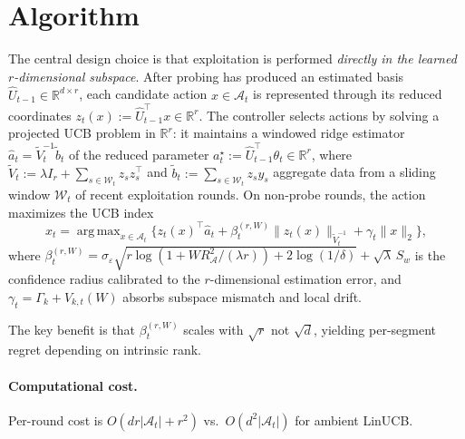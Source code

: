 \documentclass[11pt]{article}
\newcommand{\R}{\mathbb{R}}
\newcommand{\cA}{\mathcal{A}}
\DeclareMathOperator*{\argmax}{arg\,max}
\begin{document}
\section{Algorithm}
\label{sec:algorithm}

The central design choice is that exploitation is performed \emph{directly in the
learned $r$-dimensional subspace}.
After probing has produced an estimated basis
$\widehat{U}_{t-1}\in\R^{d\times r}$, each candidate action $x\in\cA_t$ is
represented through its reduced coordinates
$z_t(x):=\widehat{U}_{t-1}^\top x\in\R^r$.
The controller selects actions by solving a projected UCB problem in $\R^r$:
it maintains a windowed ridge estimator
$\widehat{a}_t = \widetilde{V}_t^{-1}\widetilde{b}_t$ of the reduced parameter
$a_t^\star := \widehat{U}_{t-1}^\top\theta_t\in\R^r$, where
$\widetilde{V}_t := \lambda I_r + \sum_{s\in\mathcal{W}_t}z_sz_s^\top$ and
$\widetilde{b}_t := \sum_{s\in\mathcal{W}_t}z_sy_s$ aggregate data from a sliding
window $\mathcal{W}_t$ of recent exploitation rounds.
On non-probe rounds, the action maximizes the UCB index
\[
x_t = \argmax_{x\in\cA_t}\bigl\{
  z_t(x)^\top\widehat{a}_t
  + \beta_t^{(r,W)}\|z_t(x)\|_{\widetilde{V}_t^{-1}}
  + \gamma_t\|x\|_2
\bigr\},
\]
where $\beta_t^{(r,W)}=\sigma_\varepsilon\sqrt{r\log(1{+}WR_{\cA}^2/(\lambda r))
+2\log(1/\delta)}+\sqrt{\lambda}\,S_w$ is the confidence radius calibrated to the
$r$-dimensional estimation error, and $\gamma_t=\Gamma_k+V_{k,t}(W)$ absorbs
subspace mismatch and local drift.

The key benefit is that $\beta_t^{(r,W)}$ scales with $\sqrt{r}$ not $\sqrt{d}$,
yielding per-segment regret depending on intrinsic rank.

\paragraph{Computational cost.}
Per-round cost is $O(dr|\cA_t|+r^2)$ vs.\ $O(d^2|\cA_t|)$ for ambient LinUCB.
\end{document}
